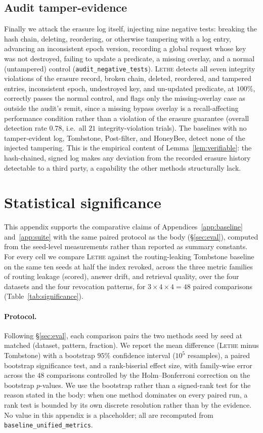 \documentclass[sigconf, nonacm, review]{acmart}
\begin{document}
\subsection{Audit tamper-evidence}
\label{app:sec-audit}
Finally we attack the erasure log itself, injecting nine negative tests:
breaking the hash chain, deleting, reordering, or otherwise tampering with a log
entry, advancing an inconsistent epoch version, recording a global request whose
key was not destroyed, failing to update a predicate, a missing overlay, and a
normal (untampered) control (\texttt{audit\_negative\_tests}). \textsc{Lethe}
detects all seven integrity violations of the erasure record, broken chain,
deleted, reordered, and tampered entries, inconsistent epoch, undestroyed key,
and un-updated predicate, at $100\%$, correctly passes the normal control,
and flags only the missing-overlay case as outside the audit's remit, since a
missing bypass overlay is a recall-affecting performance condition rather than a
violation of the erasure guarantee (overall detection rate $0.78$, i.e.\ all
$21$ integrity-violation trials). The baselines with no tamper-evident log, Tombstone, Post-filter, and HoneyBee, detect none of the injected tampering.
This is the empirical content of Lemma~\ref{lem:verifiable}: the hash-chained,
signed log makes any deviation from the recorded erasure history detectable to a
third party, a capability the other methods structurally lack.


\section{Statistical significance}
\label{app:stats}

This appendix supports the comparative claims of Appendices~\ref{app:baseline}
and~\ref{app:suite} with the same paired protocol as the body
(\S\ref{sec:eval}), computed from the seed-level measurements rather than
reported as summary constants. For every cell we compare \textsc{Lethe} against
the routing-leaking Tombstone baseline on the same ten seeds at half the index
revoked, across the three metric families of routing leakage (scored), answer
drift, and retrieval quality, over the four datasets and the four revocation
patterns, for $3\times4\times4=48$ paired comparisons
(Table~\ref{tab:significance}).

\paragraph{Protocol.}
Following \S\ref{sec:eval}, each comparison pairs the two methods seed by seed at
matched (dataset, pattern, fraction). We report the mean difference (\textsc{Lethe}
minus Tombstone) with a bootstrap $95\%$ confidence interval ($10^5$ resamples),
a paired bootstrap significance test, and a rank-biserial effect size, with
family-wise error across the $48$ comparisons controlled by the
Holm--Bonferroni correction on the bootstrap $p$-values. We use the bootstrap
rather than a signed-rank test for the reason stated in the body: when one
method dominates on every paired run, a rank test is bounded by its own discrete
resolution rather than by the evidence. No value in this appendix is a
placeholder; all are recomputed from \texttt{baseline\_unified\_metrics}.
\end{document}
